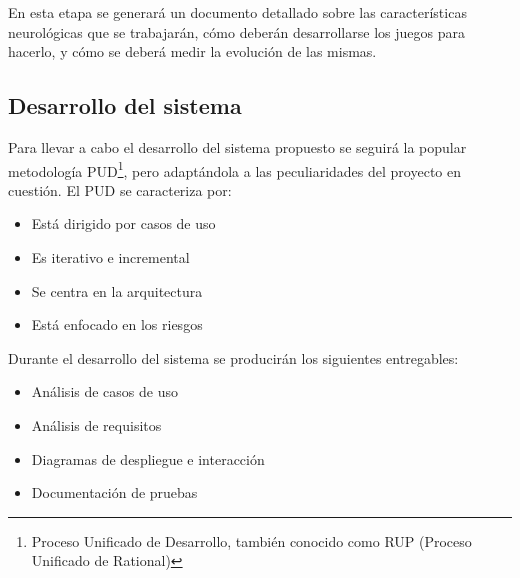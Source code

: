 \documentclass[12pt,a4paper]{article}
\begin{document}
En esta etapa se generará un documento detallado sobre las características neurológicas que se trabajarán, cómo deberán desarrollarse los juegos para hacerlo, y cómo se deberá medir la evolución de las mismas.

\subsection{Desarrollo del sistema}

Para llevar a cabo el desarrollo del sistema propuesto se seguirá la popular metodología PUD\footnote{Proceso Unificado de Desarrollo, también conocido como RUP (Proceso Unificado de Rational)}, pero adaptándola a las peculiaridades del proyecto en cuestión. El PUD se caracteriza por:

\begin{itemize}
\item Está dirigido por casos de uso
\item Es iterativo e incremental
\item Se centra en la arquitectura
\item Está enfocado en los riesgos
\end{itemize}

Durante el desarrollo del sistema se producirán los siguientes entregables:

\begin{itemize}
\item Análisis de casos de uso
\item Análisis de requisitos
\item Diagramas de despliegue e interacción
\item Documentación de pruebas
\end{itemize}



\end{document}
